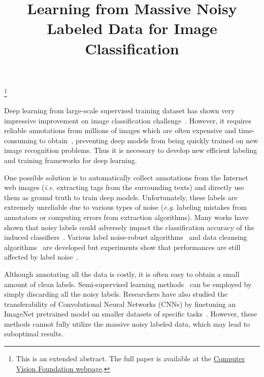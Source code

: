 \documentclass[extendedabs]{bmvc2k}
\begin{document}
\title{Learning from Massive Noisy Labeled Data for Image Classification}

\maketitle
\let\thefootnote\relax\footnote{This is an extended abstract. The full paper is available at the \href{http://www.cv-foundation.org/openaccess/CVPR2015.py}{Computer Vision Foundation webpage}. }
\vspace{-0.2in}

\noindent
Deep learning from large-scale supervised training dataset has shown very impressive improvement on image classification challenge~\cite{krizhevsky2012imagenet}. However, it requires reliable annotations from millions of images which are often expensive and time-consuming to obtain~\cite{deng2009imagenet}, preventing deep models from being quickly trained on new image recognition problems. Thus it is necessary to develop new efficient labeling and training frameworks for deep learning.

One possible solution is to automatically collect annotations from the Internet web images (\emph{i.e.} extracting tags from the surrounding texts) and directly use them as ground truth to train deep models. Unfortunately, these labels are extremely unreliable due to various types of noise (\emph{e.g.} labeling mistakes from annotators or computing errors from extraction algorithms). Many works have shown that noisy labels could adversely impact the classification accuracy of the induced classifiers~\cite{nettleton2010study}. Various label noise-robust algorithms~\cite{manwani2013noise} and data cleansing algorithms~\cite{brodley2011identifying} are developed but experiments show that performances are still affected by label noise~\cite{bartlett2006convexity}.

Although annotating all the data is costly, it is often easy to obtain a small amount of clean labels. Semi-supervised learning methods~\cite{lee2013pseudo} can be employed by simply discarding all the noisy labels. Researchers have also studied the transferability of Convolutional Neural Networks (CNNs) by finetuning an ImageNet pretrained model on smaller datasets of specific tasks~\cite{oquab2014learning}. However, these methods cannot fully utilize the massive noisy labeled data, which may lead to suboptimal results.
\end{document}
